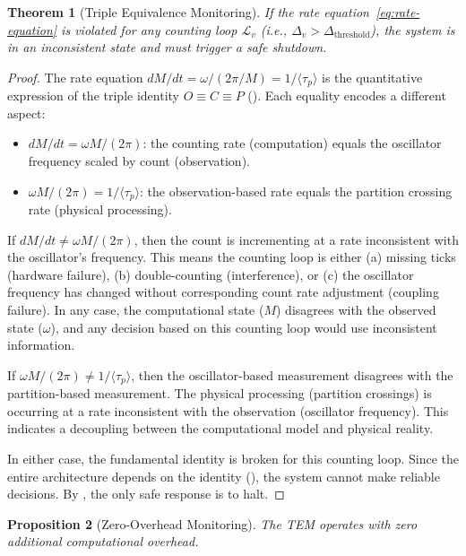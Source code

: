 \documentclass[twocolumn,10pt]{article}
\newtheorem{theorem}{Theorem}[section]
\newtheorem{proposition}[theorem]{Proposition}
\theoremstyle{definition}
\newcommand{\taup}{\tau_p}
\begin{document}
\begin{theorem}[Triple Equivalence Monitoring]
\label{thm:tem-monitoring}
If the rate equation~\eqref{eq:rate-equation} is violated for any counting loop $\mathcal{L}_v$ (i.e., $\Delta_v > \Delta_{\mathrm{threshold}}$), the system is in an inconsistent state and must trigger a safe shutdown.
\end{theorem}

\begin{proof}
The rate equation $dM/dt = \omega/(2\pi/M) = 1/\langle \taup \rangle$ is the quantitative expression of the triple identity $O \equiv C \equiv P$ (). Each equality encodes a different aspect:
\begin{itemize}[leftmargin=*]
\item $dM/dt = \omega M/(2\pi)$: the counting rate (computation) equals the oscillator frequency scaled by count (observation).
\item $\omega M/(2\pi) = 1/\langle \taup \rangle$: the observation-based rate equals the partition crossing rate (physical processing).
\end{itemize}

If $dM/dt \neq \omega M/(2\pi)$, then the count is incrementing at a rate inconsistent with the oscillator's frequency. This means the counting loop is either (a) missing ticks (hardware failure), (b) double-counting (interference), or (c) the oscillator frequency has changed without corresponding count rate adjustment (coupling failure). In any case, the computational state ($M$) disagrees with the observed state ($\omega$), and any decision based on this counting loop would use inconsistent information.

If $\omega M/(2\pi) \neq 1/\langle \taup \rangle$, then the oscillator-based measurement disagrees with the partition-based measurement. The physical processing (partition crossings) is occurring at a rate inconsistent with the observation (oscillator frequency). This indicates a decoupling between the computational model and physical reality.

In either case, the fundamental identity is broken for this counting loop. Since the entire architecture depends on the identity (), the system cannot make reliable decisions. By , the only safe response is to halt.
\end{proof}

\begin{proposition}[Zero-Overhead Monitoring]
\label{prop:zero-overhead}
The TEM operates with zero additional computational overhead.
\end{proposition}
\end{document}
